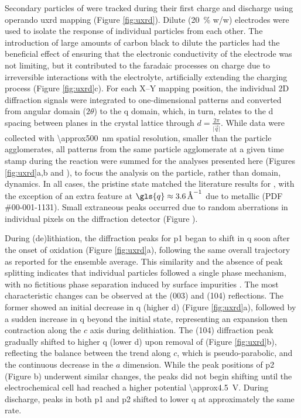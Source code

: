 \documentclass{article}
\begin{document}
Secondary particles of \nca{} were tracked during their first charge
and discharge using operando \gls{uxrd} mapping (Figure \ref{fig:uxrd}). Dilute
(\SI{20}{\percent} w/w) \nca{} electrodes were used to isolate the
response of individual particles from each other. The introduction of large amounts of carbon black to dilute the particles had the beneficial effect of ensuring that the electronic conductivity of the electrode was not limiting, but it contributed to the faradaic processes on charge due to irreversible interactions with the electrolyte\cite{kostecki2014}, artificially extending the charging process (Figure \ref{fig:uxrd}c). For each X--Y
mapping position, the individual 2D diffraction signals were
integrated to one-dimensional patterns and converted from angular
domain ($2\theta$) to the \gls{q} domain, which, in turn, relates to the \gls{d} spacing between planes in the crystal lattice through
$d=\frac{2\pi}{\vert\vec{q}\vert}$. While data were collected
with \SI{\approx500}{\nano\meter} spatial resolution, smaller than the
particle agglomerates, all patterns from the same particle agglomerate
at a given time stamp during the reaction were summed for the analyses
presented here (Figures \ref{fig:uxrd}a,b and
), to focus the analysis on the particle, rather than domain, dynamics. In all cases, the pristine state matched the
literature results for \nca{} \cite{novak2015}, with the exception of
an extra feature at $\gls{q}\approx\SI{3.6}{\per\angstrom}$ due to
metallic  (PDF \#00-001-1131). Small extraneous peaks occurred
due to random aberrations in individual pixels on the diffraction
detector (Figure ).

During (de)lithiation, the diffraction peaks for \gls{p1} began to shift in \gls{q} soon after the onset of oxidation (Figure \ref{fig:uxrd}a), following the
same overall trajectory as reported for the ensemble
average\cite{robert2015}. This similarity and the absence of peak
splitting indicates that individual particles followed a single
phase mechanism, with no fictitious phase separation induced by
surface impurities \cite{grenier2017}. The most characteristic changes
can be observed at the (003) and (104) reflections. The former showed
an initial decrease in \gls{q} (higher \gls{d}) (Figure
\ref{fig:uxrd}a), followed by a sudden increase in \gls{q} beyond the
initial state, representing an expansion then contraction along the
$c$ axis during delithiation\citeme{}. The (104) diffraction peak
gradually shifted to higher \gls{q} (lower \gls{d}) upon removal of
 (Figure \ref{fig:uxrd}b), reflecting the balance between the
trend along $c$, which is pseudo-parabolic, and the continuous decrease in the $a$
dimension.\cite{robert2015} While the peak positions of \gls{p2}
(Figure b) underwent similar changes, the peaks
did not begin shifting until the electrochemical cell had reached a
higher potential \SI{\approx4.5}{\volt}. During discharge, peaks in
both \gls{p1} and \gls{p2} shifted to lower \gls{q} at approximately
the same rate.
\end{document}
